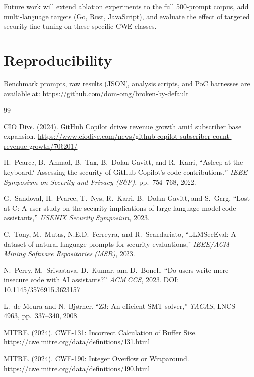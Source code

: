 \documentclass[10pt,twocolumn]{article}
\begin{document}
Future work will extend ablation experiments to the full 500-prompt
corpus, add multi-language targets (Go, Rust, JavaScript), and evaluate
the effect of targeted security fine-tuning on these specific CWE
classes.

\section*{Reproducibility}

Benchmark prompts, raw results (JSON), analysis scripts, and PoC
harnesses are available at:
\url{https://github.com/dom-omg/broken-by-default}

\begin{thebibliography}{99}

CIO Dive. (2024). GitHub Copilot drives revenue growth amid subscriber
base expansion. \url{https://www.ciodive.com/news/github-copilot-subscriber-count-revenue-growth/706201/}

H.\ Pearce, B.\ Ahmad, B.\ Tan, B.\ Dolan-Gavitt, and R.\ Karri,
``Asleep at the keyboard? Assessing the security of GitHub Copilot's
code contributions,'' \textit{IEEE Symposium on Security and Privacy
(S\&P)}, pp.\ 754--768, 2022.

G.\ Sandoval, H.\ Pearce, T.\ Nys, R.\ Karri, B.\ Dolan-Gavitt, and
S.\ Garg, ``Lost at C: A user study on the security implications of
large language model code assistants,'' \textit{USENIX Security
Symposium}, 2023.

C.\ Tony, M.\ Mutas, N.E.D.\ Ferreyra, and R.\ Scandariato,
``LLMSecEval: A dataset of natural language prompts for security
evaluations,'' \textit{IEEE/ACM Mining Software Repositories (MSR)},
2023.

N.\ Perry, M.\ Srivastava, D.\ Kumar, and D.\ Boneh,
``Do users write more insecure code with AI assistants?''
\textit{ACM CCS}, 2023.
DOI: \href{https://doi.org/10.1145/3576915.3623157}{10.1145/3576915.3623157}

L.\ de Moura and N.\ Bj{\o}rner, ``Z3: An efficient SMT solver,''
\textit{TACAS}, LNCS 4963, pp.\ 337--340, 2008.

MITRE. (2024). CWE-131: Incorrect Calculation of Buffer Size.
\url{https://cwe.mitre.org/data/definitions/131.html}

MITRE. (2024). CWE-190: Integer Overflow or Wraparound.
\url{https://cwe.mitre.org/data/definitions/190.html}


\end{thebibliography}
\end{document}
